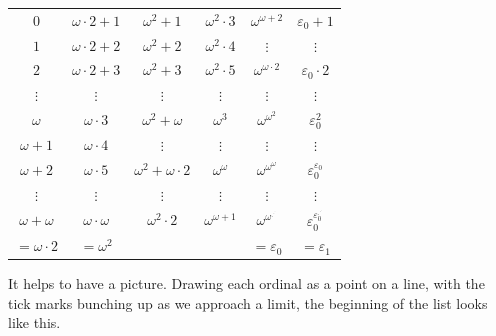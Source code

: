 \begin{center}
  \small
  \begin{tabular}{cccccc}
    $0$ & $\omega\cdot 2 + 1$ & $\omega^2 + 1$ & $\omega^2\cdot 3$ & $\omega^{\omega + 2}$ & $\varepsilon_0 + 1$ \\
    $1$ & $\omega\cdot 2 + 2$ & $\omega^2 + 2$ & $\omega^2\cdot 4$ & $\vdots$ & $\vdots$ \\
    $2$ & $\omega\cdot 2 + 3$ & $\omega^2 + 3$ & $\omega^2\cdot 5$ & $\omega^{\omega \cdot 2}$ & $\varepsilon_0 \cdot 2$ \\
    $\vdots$ & $\vdots$ & $\vdots$ & $\vdots$ & $\vdots$ & $\vdots$ \\
    $\omega$ & $\omega\cdot 3$ & $\omega^2 + \omega$ & $\omega^3$ & $\omega^{\omega^2}$ & $\varepsilon_0^2$ \\
    $\omega + 1$ & $\omega\cdot 4$ & $\vdots$ & $\vdots$ & $\vdots$ & $\vdots$ \\
    $\omega + 2$ & $\omega\cdot 5$ & $\omega^2 + \omega \cdot 2$ & $\omega^\omega$ & $\omega^{\omega^{\omega}}$ & $\varepsilon_0^{\varepsilon_0}$ \\
    $\vdots$ & $\vdots$ & $\vdots$ & $\vdots$ & $\vdots$ & $\vdots$ \\
    $\omega + \omega$ & $\omega\cdot \omega $ & $\omega^2 \cdot 2$ & $\omega^{\omega + 1}$ & $\omega^{\omega^{.^{.^.}}}$ & $\varepsilon_0^{\varepsilon_0^{.^{.^.}}}$ \\
    $=\omega\cdot 2$ & $=\omega^2$ & &  & $= \varepsilon_0$ & $= \varepsilon_1$ \\
  \end{tabular}
\end{center}

It helps to have a picture. Drawing each ordinal as a point on a line, with the tick marks bunching up as we approach a limit, the beginning of the list looks like this.

\begin{center}
\end{center}

